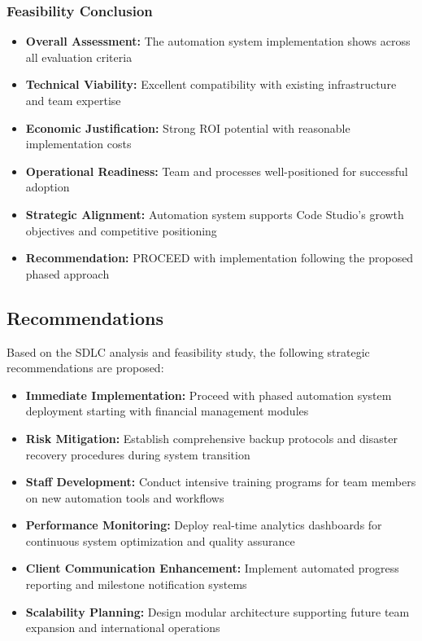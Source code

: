 \documentclass[12pt,a4paper]{article}
\begin{document}
\subsubsection{Feasibility Conclusion}
\begin{itemize}
    \item \textbf{Overall Assessment:} The automation system implementation shows across all evaluation criteria
    \item \textbf{Technical Viability:} Excellent compatibility with existing infrastructure and team expertise
    \item \textbf{Economic Justification:} Strong ROI potential with reasonable implementation costs
    \item \textbf{Operational Readiness:} Team and processes well-positioned for successful adoption
    \item \textbf{Strategic Alignment:} Automation system supports Code Studio's growth objectives and competitive positioning
    \item \textbf{Recommendation:} PROCEED with implementation following the proposed phased approach
\end{itemize}


\subsection{Recommendations}

Based on the SDLC analysis and feasibility study, the following strategic recommendations are proposed:

\begin{itemize}
    \item \textbf{Immediate Implementation:} Proceed with phased automation system deployment starting with financial management modules
    \item \textbf{Risk Mitigation:} Establish comprehensive backup protocols and disaster recovery procedures during system transition
    \item \textbf{Staff Development:} Conduct intensive training programs for team members on new automation tools and workflows
    \item \textbf{Performance Monitoring:} Deploy real-time analytics dashboards for continuous system optimization and quality assurance
    \item \textbf{Client Communication Enhancement:} Implement automated progress reporting and milestone notification systems
    \item \textbf{Scalability Planning:} Design modular architecture supporting future team expansion and international operations
\end{itemize}
\end{document}
